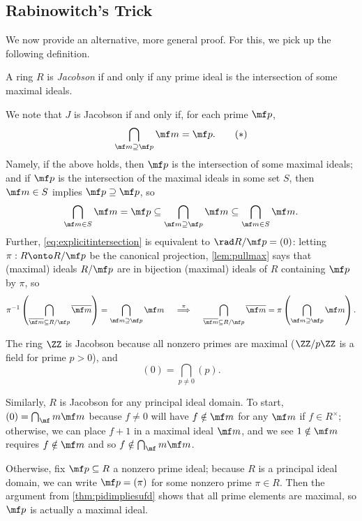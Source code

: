 \documentclass[../notes.tex]{subfiles}
\begin{document}
\subsection{Rabinowitch's Trick}
We now provide an alternative, more general proof. For this, we pick up the following definition.
\begin{definition}[Jacobson]
	A ring $R$ is \textit{Jacobson} if and only if any prime ideal is the intersection of some maximal ideals.
\end{definition}
\begin{remark}[Nir] \label{rem:jacobsonviarad}
	We note that $J$ is Jacobson if and only if, for each prime $\mf p$,
	\[\bigcap_{\mf m\supseteq\mf p}\mf m=\mf p.\tag{$*$}\label{eq:explicitintersection}\]
	Namely, if the above holds, then $\mf p$ is the intersection of some maximal ideals; and if $\mf p$ is the intersection of the maximal ideals in some set $S$, then $\mf m\in S$ implies $\mf p\supseteq\mf p$, so
	\[\bigcap_{\mf m\in S}\mf m=\mf p\subseteq\bigcap_{\mf m\supseteq\mf p}\mf m\subseteq\bigcap_{\mf m\in S}\mf m.\]
	Further, \autoref{eq:explicitintersection} is equivalent to $\rad R/\mf p=(0)$: letting $\pi:R\onto R/\mf p$ be the canonical projection, \autoref{lem:pullmax} says that (maximal) ideals $R/\mf p$ are in bijection (maximal) ideals of $R$ containing $\mf p$ by $\pi$, so
	\[\pi^{-1}\left(\bigcap_{\overline{\mf m}\subseteq R/\mf p}\overline{\mf m}\right)=\bigcap_{\mf m\supseteq\mf p}\mf m\quad\stackrel\pi\implies\quad\bigcap_{\overline{\mf m}\subseteq R/\mf p}\overline{\mf m}=\pi\left(\bigcap_{\mf m\supseteq\mf p}\mf m\right).\]
\end{remark}
\begin{example}
	The ring $\ZZ$ is Jacobson because all nonzero primes are maximal ($\ZZ/p\ZZ$ is a field for prime $p>0$), and
	\[(0)=\bigcap_{p\ne0}(p).\]
\end{example}
\begin{example} \label{ex:pidisjacobson}
	Similarly, $R$ is Jacobson for any principal ideal domain. To start, $(0)=\bigcap_\mf m\mf m$ because $f\ne0$ will have $f\notin\mf m$ for any $\mf m$ if $f\in R^\times$; otherwise, we can place $f+1$ in a maximal ideal $\mf m$, and we see $1\notin\mf m$ requires $f\notin\mf m$ and so $f\notin\bigcap_\mf m\mf m$.

	Otherwise, fix $\mf p\subseteq R$ a nonzero prime ideal; because $R$ is a principal ideal domain, we can write $\mf p=(\pi)$ for some nonzero prime $\pi\in R$. Then the argument from \autoref{thm:pidimpliesufd} shows that all prime elements are maximal, so $\mf p$ is actually a maximal ideal.
\end{example}
\end{document}
